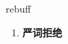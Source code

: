 
\begin{frame}
{\huge rebuff}
\begin{center}
\begin{enumerate}\Large
  \item \textbf{严词拒绝}
\end{enumerate}
\end{center}
\end{frame}
